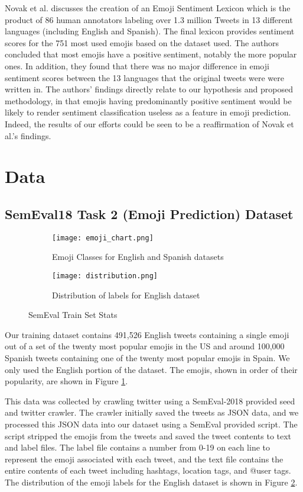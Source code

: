 \documentclass[11pt]{article}
\begin{document}
Novak et al. \cite{novak2015sentiment} discusses the creation of an Emoji Sentiment Lexicon which is the product of 86 human annotators labeling over 1.3 million Tweets in 13 different languages (including English and Spanish). The final lexicon provides sentiment scores for the 751 most used emojis based on the dataset used. The authors concluded that most emojis have a positive sentiment, notably the more popular ones. In addition, they found that there was no major difference in emoji sentiment scores between the 13 languages that the original tweets were were written in. The authors' findings directly relate to our hypothesis and proposed methodology, in that emojis having predominantly positive sentiment would be likely to render sentiment classification useless as a feature in emoji prediction. Indeed, the results of our efforts could be seen to be a reaffirmation of Novak et al.'s findings.

\section{Data}

\subsection{SemEval18 Task 2 (Emoji Prediction) Dataset}
\begin{figure}
\centering
\begin{subfigure}[b]{.5\textwidth}
  \centering
  \texttt{[image: emoji\_chart.png]}
  \caption{Emoji Classes for English and Spanish datasets}
  \label{fig:emojis}
\end{subfigure}%
\begin{subfigure}[b]{.5\textwidth}
  \centering
  \texttt{[image: distribution.png]}
  \caption{Distribution of labels for English dataset}
  \label{fig:distribution}
\end{subfigure}
\caption{SemEval Train Set Stats}
\label{fig:semevaltrain}
\end{figure}
Our training dataset contains 491,526 English tweets containing a single emoji out of a set of the twenty most popular emojis in the US and around 100,000 Spanish tweets containing one of the twenty most popular emojis in Spain. We only used the English portion of the dataset. The emojis, shown in order of their popularity, are shown in Figure \ref{fig:emojis}.

This data was collected by crawling twitter using a SemEval-2018 provided seed and twitter crawler. The crawler initially saved the tweets as JSON data, and we processed this JSON data into our dataset using a SemEval provided script. The script stripped the emojis from the tweets and saved the tweet contents to text and label files. The label file contains a number from 0-19 on each line to represent the emoji associated with each tweet, and the text file contains the entire contents of each tweet including hashtags, location tags, and @user tags. The distribution of the emoji labels for the English dataset is shown in Figure \ref{fig:distribution}.
\end{document}
